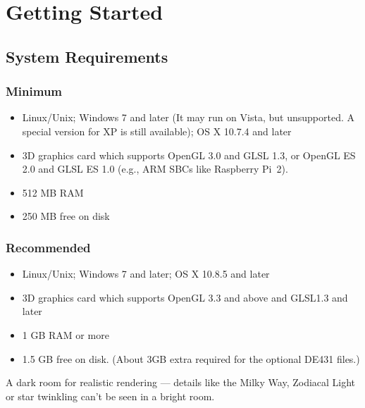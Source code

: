 

\chapter{Getting Started}
\label{ch:GettingStarted}

\section{System Requirements}
\label{sec:GettingStarted:SystemRequirements}

\subsection{Minimum}
\begin{itemize}
\item Linux/Unix; Windows 7 and later (It may run on Vista, but unsupported. A special version for XP is still available); OS X 10.7.4 and later
\item 3D graphics card which supports OpenGL 3.0 and GLSL 1.3, or OpenGL ES 2.0 and GLSL ES 1.0 (e.g., ARM SBCs like Raspberry Pi~2).
\item 512 MB RAM
\item 250 MB free on disk
\end{itemize}

\subsection{Recommended}
\begin{itemize}
\item Linux/Unix; Windows 7 and later; OS X 10.8.5 and later
\item 3D graphics card which supports OpenGL 3.3 and above and GLSL1.3 and later
\item 1 GB RAM or more
\item 1.5 GB free on disk. (About 3GB extra required for the optional DE431 files.)
\end{itemize}
 A dark room for realistic rendering --- details like the Milky Way, Zodiacal Light or
star twinkling can't be seen in a bright room.

